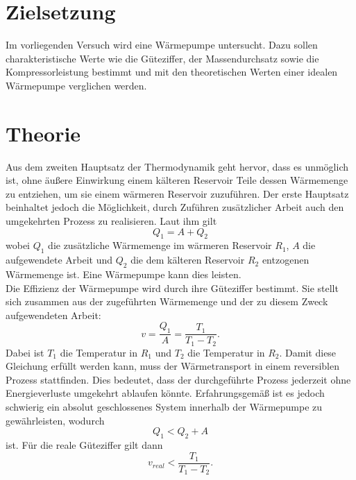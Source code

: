 \section{Zielsetzung}
Im vorliegenden Versuch wird eine Wärmepumpe untersucht.
Dazu sollen charakteristische Werte wie die Güteziffer, der Massendurchsatz sowie die Kompressorleistung bestimmt und mit den theoretischen Werten einer idealen Wärmepumpe verglichen werden.

\section{Theorie}
\label{sec:Theorie}
Aus dem zweiten Hauptsatz der Thermodynamik geht hervor, dass es unmöglich ist, ohne äußere Einwirkung einem kälteren Reservoir Teile dessen Wärmemenge zu entziehen, um sie einem wärmeren Reservoir zuzuführen.
Der erste Hauptsatz beinhaltet jedoch die Möglichkeit, durch Zuführen zusätzlicher Arbeit auch den umgekehrten Prozess zu realisieren. Laut ihm gilt
\begin{equation}
  Q_1 = A + Q_2
\end{equation}
wobei $Q_1$ die zusätzliche Wärmemenge im wärmeren Reservoir $ R_1 $, $A$ die aufgewendete Arbeit und $Q_2$ die dem kälteren Reservoir $R_2$ entzogenen Wärmemenge ist.
Eine Wärmepumpe kann dies leisten.\\
Die Effizienz der Wärmepumpe wird durch ihre Güteziffer bestimmt.
Sie stellt sich zusammen aus der zugeführten Wärmemenge und der zu diesem Zweck aufgewendeten Arbeit:
\begin{equation}
  v = \frac{Q_1}{A}=\frac{T_1}{T_1-T_2}.
\end{equation}
Dabei ist $ T_1 $ die Temperatur in $R_1$ und $ T_2 $ die Temperatur in $ R_2 $.
Damit diese Gleichung erfüllt werden kann, muss der Wärmetransport in einem reversiblen Prozess stattfinden.
Dies bedeutet, dass der durchgeführte Prozess jederzeit ohne Energieverluste umgekehrt ablaufen könnte.
Erfahrungsgemäß ist es jedoch schwierig ein absolut geschlossenes System innerhalb der Wärmepumpe zu gewährleisten, wodurch
\begin{equation}
  Q_1 < Q_2 + A
\end{equation}
ist.
Für die reale Güteziffer gilt dann
\begin{equation}
  v_{real} < \frac{T_1}{T_1-T_2}.
\end{equation}
\cite{sample}
